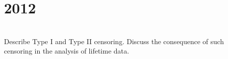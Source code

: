 \section*{2012}
\vspace{-.5cm}
\hrulefill \smallskip\\
 Describe Type I and Type II censoring. Discuss the consequence of such censoring in the analysis of lifetime data.